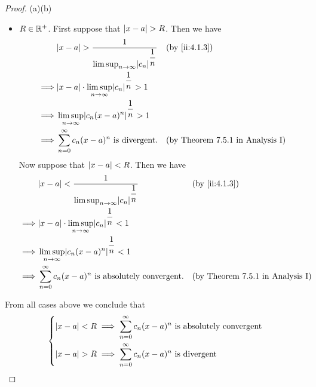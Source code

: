 \begin{proof}{(a)}{(b)}
\begin{itemize}
    \item \(R \in \mathbb{R}^+\).
          First suppose that \(\left\lvert x - a\right\rvert > R\).
          Then we have
          \begin{align*}
                     & \abs{x - a} > \dfrac{1}{\limsup_{n \to \infty} \abs{c_n}^{\dfrac{1}{n}}} &  & \by{ii:4.1.3}                              \\
            \implies & \abs{x - a} \cdot \limsup_{n \to \infty} \abs{c_n}^{\dfrac{1}{n}} > 1                                                 \\
            \implies & \limsup_{n \to \infty} \abs{c_n (x - a)^n}^{\dfrac{1}{n}} > 1                                                         \\
            \implies & \sum_{n = 0}^\infty c_n (x - a)^n \text{ is divergent}.                  &  & \text{(by Theorem 7.5.1 in Analysis I)}
          \end{align*}
          Now suppose that \(\left\lvert x - a\right\rvert < R\).
          Then we have
          \begin{align*}
                     & \abs{x - a} < \dfrac{1}{\limsup_{n \to \infty} \abs{c_n}^{\dfrac{1}{n}}} &  & \by{ii:4.1.3}                              \\
            \implies & \abs{x - a} \cdot \limsup_{n \to \infty} \abs{c_n}^{\dfrac{1}{n}} < 1                                                 \\
            \implies & \limsup_{n \to \infty} \abs{c_n (x - a)^n}^{\dfrac{1}{n}} < 1                                                         \\
            \implies & \sum_{n = 0}^\infty c_n (x - a)^n \text{ is absolutely convergent}.      &  & \text{(by Theorem 7.5.1 in Analysis I)}
          \end{align*}
  \end{itemize}
  From all cases above we conclude that
  \[
    \begin{dcases}
      \left\lvert x - a\right\rvert < R \implies \sum_{n = 0}^\infty c_n (x - a)^n \text{ is absolutely convergent} \\
      \left\lvert x - a\right\rvert > R \implies \sum_{n = 0}^\infty c_n (x - a)^n \text{ is divergent}
    \end{dcases}
  \]
\end{proof}

